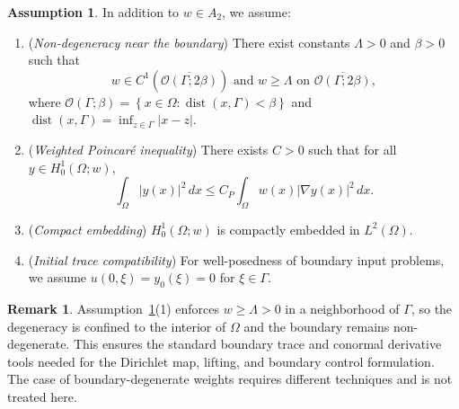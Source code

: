 \documentclass[preprint,12pt]{elsarticle}
\theoremstyle{definition}   %
\newtheorem{remark}[theorem]{Remark}
\newtheorem{assumption}[theorem]{Assumption}
\numberwithin{equation}{section}
\def\ol{\overline}
\def\Om{\Omega}
\def\be{\beta}
\def\Ga{\Gamma}
\def\La{\Lambda}
\def\mcO{\mathcal{O}}
\DeclareMathOperator{\dist}{dist}
\begin{document}
\begin{assumption}\label{06.27.A1}\label{ass:2.2}
In addition to $w\in A_2$, we assume:
\begin{enumerate}
  \item (\textit{Non-degeneracy near the boundary}) There exist constants $\Lambda>0$ and $\beta>0$ such that
	\begin{equation}\label{08.13.1}
		w\in C^1(\ol{\mcO(\Ga;2\be)}) \mbox{ and } w\geq \La \mbox{ on } \ol{\mcO(\Ga;2\beta)},
	\end{equation}
	where $\mcO(\Ga;\beta)=\left\{x\in\Om\colon \dist(x,\Ga)<\beta\right\}$ and $\dist(x,\Ga)=\inf_{z\in \Ga}|x-z|$.
  \item (\textit{Weighted Poincar\'e inequality}) There exists $C>0$ such that for all $y\in H^1_0(\Omega;w)$,
\[
\int_{\Omega} |y(x)|^2\, dx \le C_P \int_{\Omega} w(x)|\nabla y(x)|^2\, dx.
\]

  \item (\textit{Compact embedding}) $H^1_0(\Omega;w)$ is compactly embedded in $L^2(\Omega)$.

  \item (\textit{Initial trace compatibility}) For well-posedness of boundary input problems, we assume $u(0,\xi) = y_0(\xi) = 0$ for $\xi\in \Gamma$.
\end{enumerate}
\end{assumption}

\begin{remark}
Assumption~\ref{06.27.A1}(1) enforces $w\ge \Lambda>0$ in a neighborhood of $\Gamma$, so the degeneracy is confined to the interior of $\Omega$ and the boundary remains non-degenerate. This ensures the standard boundary trace and conormal derivative tools needed for the Dirichlet map, lifting, and boundary control formulation. The case of boundary-degenerate weights requires different techniques and is not treated here.
\end{remark}
\end{document}
